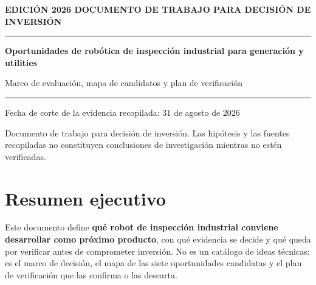 \documentclass[11pt,a4paper]{article}
\begin{document}

\begin{titlepage}
\thispagestyle{empty}
\setlength{\parindent}{0pt}\raggedright
\vspace*{3cm}
{\sffamily\footnotesize\bfseries\color{navy}\MakeUppercase{Edición 2026 \textperiodcentered{} Documento de trabajo para decisión de inversión}\par}
\vspace{8pt}
{\color{navy}\rule{\linewidth}{2.5pt}}
\vspace{22pt}

{\sffamily\huge\bfseries Oportunidades de robótica de inspección industrial para generación y utilities\par}
\vspace{14pt}
{\sffamily\large\color{gray2} Marco de evaluación, mapa de candidatos y plan de verificación\par}
\vspace{30pt}
{\color{rule2}\rule{0.35\linewidth}{0.6pt}\par}
\vspace{12pt}
{\normalsize Fecha de corte de la evidencia recopilada: 31 de agosto de 2026\par}
\vfill
{\sffamily\footnotesize\color{gray2}Documento de trabajo para decisión de inversión. Las hipótesis y las fuentes recopiladas no constituyen conclusiones de investigación mientras no estén verificadas.\par}
\end{titlepage}
\setcounter{page}{2}

\tableofcontents
\clearpage
{}

\clearpage

\section*{Resumen ejecutivo}

Este documento define \textbf{qué robot de inspección industrial conviene desarrollar como próximo producto}, con qué evidencia se decide y qué queda por verificar antes de comprometer inversión. No es un catálogo de ideas técnicas: es el marco de decisión, el mapa de las siete oportunidades candidatas y el plan de verificación que las confirma o las descarta.
\end{document}
